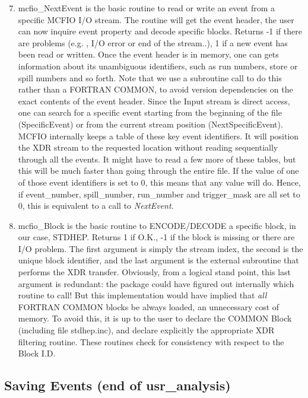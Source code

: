 \begin{enumerate}
\setcounter{enumi}{6}
\item  mcfio\_NextEvent is the basic routine to read or write an event from
a specific MCFIO I/O stream. The routine will get the event header, the user can
now  inquire event property and decode specific blocks. Returns -1 if there are
problems (e.g. , I/O error or end  of the stream..), 1 if a new event has been read or
written.  Once the event header is in memory, one can gets information  about
its unambiguous identifiers, such as run numbers, store or spill  numbers and
so forth. Note that we use a subroutine call to do this rather  than a FORTRAN
COMMON, to avoid version dependencies on the exact contents of the event
header.  Since the Input stream is direct access,  one can search for a
specific event starting from the beginning of the  file (SpecificEvent) or from
the current stream position  (NextSpecificEvent). MCFIO internally keeps 
a table of these  key event identifiers. It will position the XDR  stream to
the requested location without reading  sequentially through all the events. It
might have  to read a few more of these tables, but this will  be much faster
than going through the entire file. If the value of one of those event 
identifiers is set to 0, this means that any value will do. Hence, if 
event\_number, spill\_number, run\_number and trigger\_mask are all set to 
0, this is equivalent to a call to {\em NextEvent}. 

\item mcfio\_Block is the basic routine to ENCODE/DECODE a 
specific block, in our case, STDHEP. Returns 1 if O.K., -1 if the block is 
missing or there are I/O problem. The first argument is simply the stream index, 
the second is the unique block identifier, and the last argument is the 
external subroutine that performs the XDR transfer. Obviously, from a 
logical stand point, this last argument is redundant: the package could 
have figured out internally which routine to call! But this implementation
would have implied that {\em all } FORTRAN COMMON blocks be always 
loaded, an unnecessary cost of memory. To avoid this, it is up to the 
user to declare the COMMON Block (including file stdhep.inc), and declare 
explicitly the appropriate XDR filtering routine.  These routines
check for consistency with respect to the Block I.D.

\end{enumerate}

\subsection{Saving Events (end of usr\_analysis)}
\vspace{.1in}

